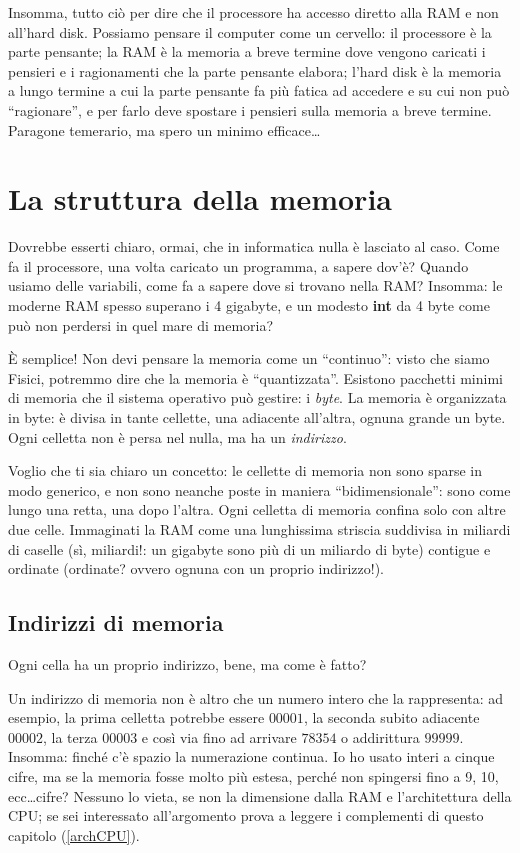 	Insomma, tutto ciò per dire che il processore ha accesso diretto alla RAM e non all'hard disk. Possiamo pensare il computer come un cervello: il processore è la parte pensante; la RAM è la memoria a breve termine dove vengono caricati i pensieri e i ragionamenti che la parte pensante elabora; l'hard disk è la memoria a lungo termine a cui la parte pensante fa più fatica ad accedere e su cui non può ``ragionare'', e per farlo deve spostare i pensieri sulla memoria a breve termine. Paragone temerario, ma spero un minimo efficace\ldots

	
	\section{La struttura della memoria}	
	Dovrebbe esserti chiaro, ormai, che in informatica nulla è lasciato al caso. Come fa il processore, una volta caricato un programma, a sapere dov'è? Quando usiamo delle variabili, come fa a sapere dove si trovano nella RAM? Insomma: le moderne RAM spesso superano i 4 gigabyte, e un modesto \textbf{int} da 4 byte come può non perdersi in quel mare di memoria?
	
	\`E semplice! Non devi pensare la memoria come un ``continuo'': visto che siamo Fisici, potremmo dire che la memoria è ``quantizzata''. Esistono pacchetti minimi di memoria che il sistema operativo può gestire: i \emph{byte}. La memoria è organizzata in byte: è divisa in tante cellette, una adiacente all'altra, ognuna grande un byte. \\
	Ogni celletta non è persa nel nulla, ma ha un \emph{indirizzo}. 
	
	Voglio che ti sia chiaro un concetto: le cellette di memoria non sono sparse in modo generico, e non sono neanche poste in maniera ``bidimensionale'': sono come lungo una retta, una dopo l'altra. Ogni celletta di memoria confina solo con altre due celle. Immaginati la RAM come una lunghissima striscia suddivisa in miliardi di caselle (sì, miliardi!: un gigabyte sono più di un miliardo di byte) contigue e ordinate (ordinate? ovvero ognuna con un proprio indirizzo!).
	\subsection{Indirizzi di memoria}
	Ogni cella ha un proprio indirizzo, bene, ma come è fatto? 
	
	Un indirizzo di memoria non è altro che un numero intero che la rappresenta: ad esempio, la prima celletta potrebbe essere $00001$, la seconda subito adiacente $00002$, la terza $00003$ e così via fino ad arrivare $78354$ o addirittura $99999$. Insomma: finché c'è spazio la numerazione continua. Io ho usato interi a cinque cifre, ma se la memoria fosse molto più estesa, perché non spingersi fino a 9, 10, ecc\ldots cifre? Nessuno lo vieta, se non la dimensione dalla RAM e l'architettura della CPU; se sei interessato all'argomento prova a leggere i complementi di questo capitolo (\ref{archCPU}).
	
